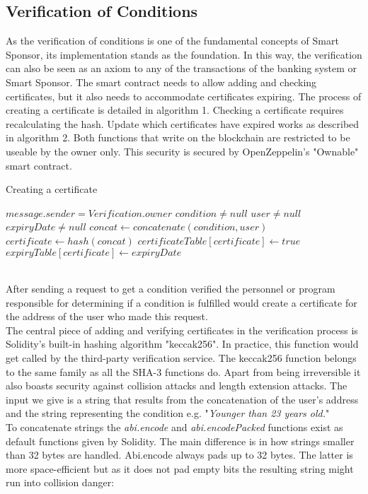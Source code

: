 \subsection{Verification of Conditions}
As the verification of conditions is one of the fundamental concepts of Smart Sponsor, its implementation stands as the foundation. In this way, the verification can also be seen as an axiom to any of the transactions of the banking system or Smart Sponsor. The smart contract needs to allow adding and checking certificates, but it also needs to accommodate certificates expiring. The process of creating a certificate is detailed in algorithm 1. Checking a certificate requires recalculating the hash. Update which certificates have expired works as described in algorithm 2. Both functions that write on the blockchain are restricted to be useable by the owner only. This security is secured by OpenZeppelin's "Ownable" smart contract\cite{Zeppelin}.\\
\begin{algorithm}
\caption{Creating a certificate}\label{alg:create}
\begin{algorithmic}
\Require $message.sender = Verification.owner$
\Require $condition \neq null$
\Require $user \neq null$
\Require $expiryDate \neq null$
\State $concat \gets concatenate(condition, user)$ 
\State $certificate \gets hash(concat)$
    \State $certificateTable[certificate] \gets true $
\EndIf
\State $expiryTable[certificate] \gets expiryDate$
\end{algorithmic}
\end{algorithm}
\\
After sending a request to get a condition verified the personnel or program responsible for determining if a condition is fulfilled would create a certificate for the address of the user who made this request.\\
The central piece of adding and verifying certificates in the verification process is Solidity's built-in hashing algorithm "keccak256". In practice, this function would get called by the third-party verification service. The keccak256 function belongs to the same family as all the SHA-3 functions do. Apart from being irreversible it also boasts security against collision attacks and length extension attacks. The input we give is a string that results from the concatenation of the user's address and the string representing the condition e.g. "\emph{Younger than 23 years old.}"\\
To concatenate strings the \emph{abi.encode} and \emph{abi.encodePacked} functions exist as default functions given by Solidity. The main difference is in how strings smaller than 32 bytes are handled. Abi.encode always pads up to 32 bytes. The latter is more space-efficient but as it does not pad empty bits the resulting string might run into collision danger:
